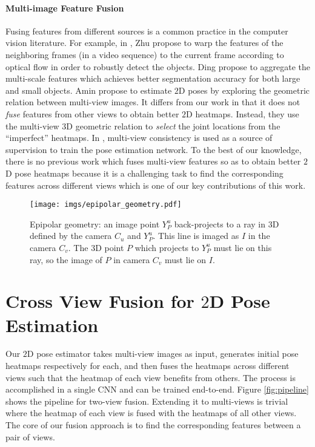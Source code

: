 \documentclass[10pt,twocolumn,letterpaper]{article}
\begin{document}
\paragraph{Multi-image Feature Fusion} Fusing features from different sources is a common practice in the computer vision literature. For example, in \cite{zhu2017flow}, Zhu \etal propose to warp the features of the neighboring frames (in a video sequence) to the current frame according to optical flow in order to robustly detect the objects. Ding \etal \cite{Ding_2018_CVPR} propose to aggregate the multi-scale features which achieves better segmentation accuracy for both large and small objects.  Amin \etal \cite{amin2013multi} propose to estimate $2$D poses by exploring the geometric relation between multi-view images. It differs from our work in that it does not \emph{fuse} features from other views to obtain better $2$D heatmaps. Instead, they use the multi-view $3$D geometric relation to \emph{select} the joint locations from the  ``imperfect'' heatmaps. In \cite{jafarian2018monet}, multi-view consistency is used as a source of supervision to train the pose estimation network. To the best of our knowledge, there is no previous work which fuses multi-view features so as to obtain better $2$D pose heatmaps because it is a challenging task to find the corresponding features across different views which is one of our key contributions of this work.

\begin{figure}
	\centering
	\texttt{[image: imgs/epipolar\_geometry.pdf]}
	\caption{Epipolar geometry: an image point $Y_P^u$ back-projects to a ray in 3D defined by the camera $C_u$ and $Y_P^u$. This line is imaged as $I$ in the camera $C_v$. The 3D point $P$ which projects to $Y_P^u$ must lie on this ray, so the image of $P$ in camera $C_v$ must lie on $I$.}
	\label{fig:epipolar_geometry}
\end{figure}


\section{Cross View Fusion for $2$D Pose Estimation}
Our $2$D pose estimator takes multi-view images as input, generates initial pose heatmaps respectively for each, and then
fuses the heatmaps across different views such that the heatmap of each view benefits from others. The process is accomplished in a single CNN and can be trained end-to-end. Figure \ref{fig:pipeline} shows the pipeline for two-view fusion. Extending it to multi-views is trivial where the heatmap of each view is fused with the heatmaps of all other views. The core of our fusion approach is to find the corresponding features between a pair of views.
\end{document}
